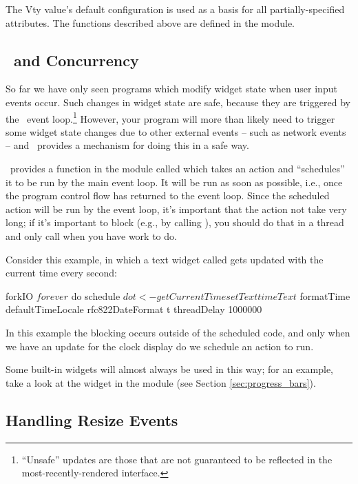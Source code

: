 The Vty  value's default configuration is used as a
basis for all partially-specified attributes.  The functions described
above are defined in the  module.

\subsection{\vtyui\ and Concurrency}
\label{sec:concurrency}

So far we have only seen programs which modify widget state when user
input events occur.  Such changes in widget state are safe, because
they are triggered by the \vtyui\ event loop.\footnote{``Unsafe''
  updates are those that are not guaranteed to be reflected in the
  most-recently-rendered interface.}  However, your program will more
than likely need to trigger some widget state changes due to other
external events -- such as network events -- and \vtyui\ provides a
mechanism for doing this in a safe way.

\vtyui\ provides a function in the  module called
 which takes an  action and ``schedules'' it to be
run by the main event loop.  It will be run as soon as possible, i.e.,
once the program control flow has returned to the event loop.  Since
the scheduled action will be run by the event loop, it's important
that the action not take very long; if it's important to block (e.g.,
by calling ), you should do that in
a thread and only call  when you have work to do.

Consider this example, in which a text widget called 
gets updated with the current time every second:

\begin{haskellcode}
 forkIO $
   forever $ do
     schedule $ do
       t <- getCurrentTime
       setText timeText $
         formatTime defaultTimeLocale rfc822DateFormat t
     threadDelay 1000000
\end{haskellcode}

In this example the blocking occurs outside of the scheduled code, and
only when we have an update for the clock display do we schedule an
action to run.

Some built-in widgets will almost always be used in this way; for an
example, take a look at the  widget in the
 module (see Section \ref{sec:progress_bars}).

\subsection{Handling Resize Events}

